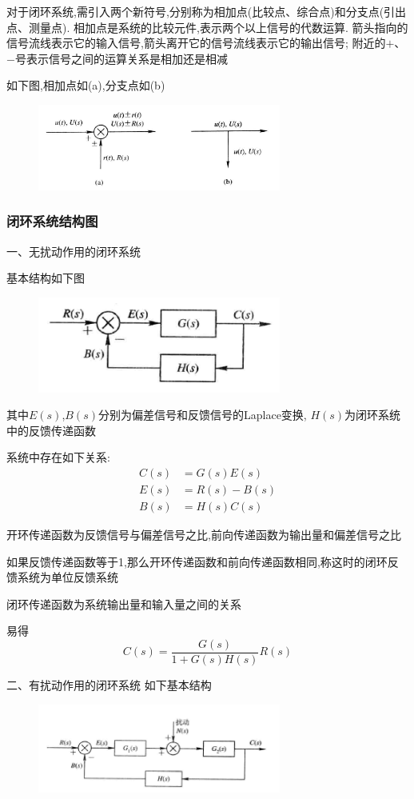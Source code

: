 \documentclass[12pt,a4paper,oneside]{ctexart}
\begin{document}
对于闭环系统,需引入两个新符号,分别称为相加点(比较点、综合点)和分支点(引出点、测量点).
相加点是系统的比较元件,表示两个以上信号的代数运算.
箭头指向的信号流线表示它的输入信号,箭头离开它的信号流线表示它的输出信号;
附近的$+$、$-$号表示信号之间的运算关系是相加还是相减

如下图,相加点如(a),分支点如(b)
\begin{figure}[H]
    \centering
    \includegraphics[width=8cm]{photos/相加点和分支点.png}
\end{figure}

\subsubsection{闭环系统结构图}
一、无扰动作用的闭环系统

基本结构如下图
\begin{figure}[H]
    \centering
    \includegraphics[width=8cm]{photos/无扰动闭环系统.png}
\end{figure}

其中$E(s)$,$B(s)$分别为偏差信号和反馈信号的Laplace变换,
$H(s)$为闭环系统中的反馈传递函数

系统中存在如下关系:
\begin{align*}
    C(s)&=G(s)E(s)\\
    E(s)&=R(s)-B(s)\\
    B(s)&=H(s)C(s)
\end{align*}

开环传递函数为反馈信号与偏差信号之比,前向传递函数为输出量和偏差信号之比

如果反馈传递函数等于1,那么开环传递函数和前向传递函数相同,称这时的闭环反馈系统为单位反馈系统

闭环传递函数为系统输出量和输入量之间的关系

易得
\[
    C(s)=\frac{G(s)}{1+G(s)H(s)}R(s)
\]

二、有扰动作用的闭环系统
如下基本结构
\begin{figure}[H]
    \centering
    \includegraphics[width=8cm]{photos/有扰动闭环系统.png}
\end{figure}
\end{document}
